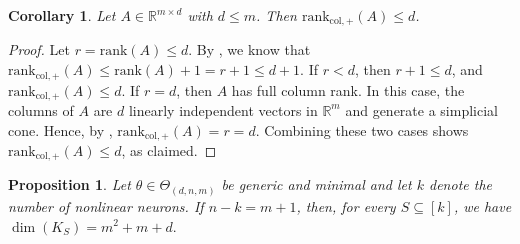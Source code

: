 \documentclass{article}
\newtheorem{prop}[theorem]{Proposition}
\newtheorem{cor}[theorem]{Corollary}
\theoremstyle{definition}
\newcommand{\paramspace}[1]{\Theta_{#1}}
\newcommand{\nncr}[1]{\mathrm{rank}_{\mathrm{col},+}(#1)}
\begin{document}
\begin{cor}
\label{cor:nncr=rank}
Let $A \in \mathbb{R}^{m \times d}$ with $d \leq m$. Then $\nncr{A}\leq d$.
\end{cor}


\begin{proof}
Let $r = \mathrm{rank}(A) \le d$. By , we know that
\(
\nncr{A} \le \mathrm{rank}(A) + 1 = r + 1 \le d + 1.
\)
If $r < d$, then $r+1 \le d$, and $\nncr{A} \le d$. 
%
If $r = d$, then $A$ has full column rank. In this case, the columns of $A$ are $d$ linearly independent vectors in $\mathbb{R}^m$ 
and generate a simplicial cone. 
Hence, by , $\nncr{A} = r = d$.  
Combining these two cases shows
\(
\nncr{A} \le d
\), as claimed. 
\end{proof} 
\begin{prop}
\label{prop:dim_special_case}
Let $\theta \in \paramspace{(d,n,m)}$ be generic and minimal and let $k$ denote the number of nonlinear neurons. If $n-k = m+1$, then, for every $S \subseteq [k]$, we have
$
\dim(K_S)= m^2 +m +d. 
$
\end{prop}
\end{document}
